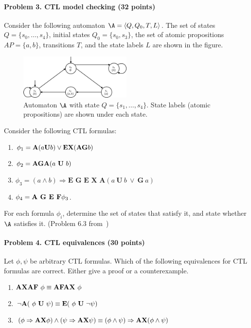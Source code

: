 \documentclass[11pt]{article}
\begin{document}
\paragraph{Problem 3. CTL model checking (32 points)}
	\label{ex:CTL:mc}
	Consider the following automaton $\A = \langle Q, Q_0, T, L\rangle$. The set of states $Q = \{s_0,\ldots, s_4\}$, initial states $Q_0 = \{s_0, s_3\}$, the set of atomic propositions $AP = \{a,b\}$, transitions $T$, and the state labels $L$ are shown in the figure.
\begin{figure}[h!]
\centering
	\includegraphics[width=0.5\textwidth]{ctl.png}
	\caption{Automaton $\A$ with state $Q = \{s_1, \ldots, s_4\}$. State labels (atomic propositions) are shown under each state.}
\end{figure}

Consider the following CTL formulas:
	\begin{enumerate}
		\item $\phi_1 = {\bf A }(a {\bf U} b) \vee {\bf E X} ({\bf AG} b) $
		\item $\phi_2 = {\bf A G A} (a\ {\bf U}\ b)$
		\item $\phi_3 = (a \wedge b) \Rightarrow \textbf{E G E X A} (a \ \textbf{U}\ b \ \vee\ \textbf{G}\ a)$
		\item $\phi_4 = \textbf{A G E F\/} \phi_3$.
	\end{enumerate}
	For each formula $\phi_i$, determine the set of states that satisfy it, and state whether $\A$ satisfies it.
	(Problem 6.3 from~\cite{Baier:2008:PMC})

\paragraph{Problem 4. CTL equivalences (30 points)}
	\label{ex:CTL:mc}
Let $\phi, \psi$ be arbitrary CTL formulas. Which of the following equivalences for CTL formulas are correct. Either give a proof or a counterexample.
\begin{enumerate}
\item ${\bf A X A F}\ \phi \equiv {\bf A F A X}\ \phi$
\item $\neg {\bf A} (\ \phi\ {\bf U}\ \psi) \equiv {\bf E}(\ \phi \ {\bf U}\ \neg \psi)$
\item $(\phi \Rightarrow {\bf AX} \phi) \wedge (\psi \Rightarrow {\bf AX} \psi) \equiv 	(\phi \wedge \psi )\Rightarrow {\bf AX} (\phi \wedge \psi)$
\end{enumerate}
\end{document}
